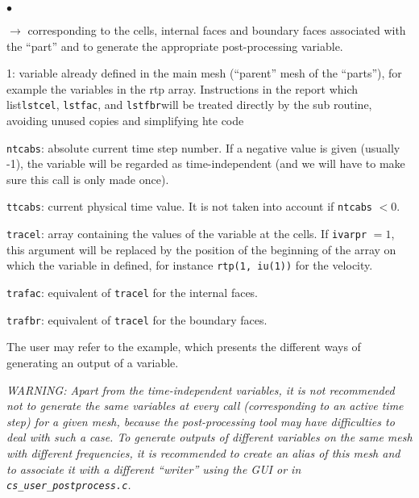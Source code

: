 {{{\begin{list}{$\bullet$}{}
\begin{list}{$\rightarrow$}{}
                     corresponding to the cells, internal faces and
                     boundary faces associated with the ``part'' and to
                     generate the appropriate post-processing variable.
               \item 1: variable already defined in the main mesh
                     (``parent'' mesh of the ``parts''), for example the
 variables in the rtp array. Instructions in the report which list\texttt
{lstcel}, \texttt{lstfac}, and \texttt{lstfbr}will be treated directly by
 the sub routine, avoiding unused copies and simplifying hte code
         \end{list}
       \item \texttt{ntcabs}: absolute current time step number. If a
             negative value is given (usually -1), the variable will be
             regarded  as time-independent (and we will have to make sure this
             call is only made once).
       \item \texttt{ttcabs}: current physical time value. It is not taken
             into account if \texttt{ntcabs} $< 0$.
       \item \texttt{tracel}: array containing the values of the
             variable at the cells. If \texttt{ivarpr} $= 1$, this
             argument will be replaced by the position of the beginning
             of the array on which the variable in defined, for instance
             \texttt{rtp(1, iu(1))} for the velocity.
       \item \texttt{trafac}: equivalent of \texttt{tracel} for the
             internal faces.
       \item \texttt{trafbr}: equivalent of \texttt{tracel} for the
             boundary faces.
\end{list}

The user may refer to the example, which presents the different ways of
generating an output of a variable.

{\em WARNING: Apart from the time-independent variables, it is not
recommended not to generate the same variables at every call
(corresponding to an active time step) for a given mesh, because the
post-processing tool may have difficulties to deal with such a case. To
generate outputs of different variables on the same mesh with different
frequencies, it is recommended to create an alias of this mesh and to
associate it with a different ``writer'' using the GUI or in
\texttt{cs\_user\_postprocess.c}.}

}}}
